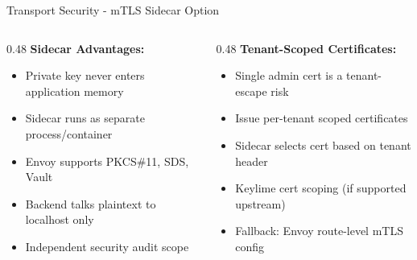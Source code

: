 \begin{frame}{Transport Security - mTLS Sidecar Option}
  \scriptsize
  \begin{columns}[T]
    \begin{column}{0.48\textwidth}
      \textbf{Sidecar Advantages:}
      \begin{itemize}
        \setlength{\itemsep}{0pt}
        \item Private key never enters application memory
        \item Sidecar runs as separate process/container
        \item Envoy supports PKCS\#11, SDS, Vault
        \item Backend talks plaintext to localhost only
        \item Independent security audit scope
      \end{itemize}
    \end{column}
    \begin{column}{0.48\textwidth}
      \textbf{Tenant-Scoped Certificates:}
      \begin{itemize}
        \setlength{\itemsep}{0pt}
        \item Single admin cert is a tenant-escape risk
        \item Issue per-tenant scoped certificates
        \item Sidecar selects cert based on tenant header
        \item Keylime cert scoping (if supported upstream)
        \item Fallback: Envoy route-level mTLS config
      \end{itemize}
    \end{column}
  \end{columns}
\end{frame}

